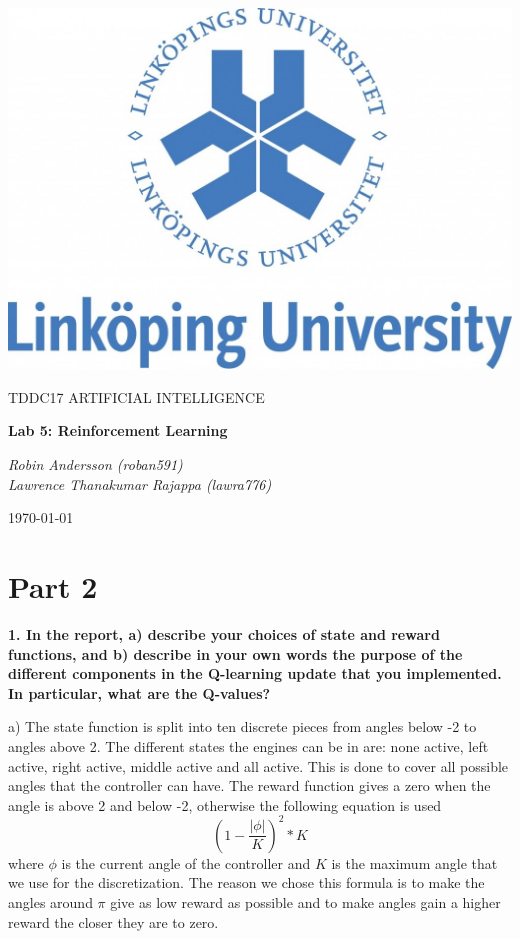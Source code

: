 \documentclass[a4paper,10pt]{article}
\begin{document}
\begin{titlepage}
	\centering
	\includegraphics[width=.6\textwidth]{liu-logo.png}\par
	\vfill
	{\scshape\Large TDDC17 ARTIFICIAL INTELLIGENCE\par}
	{\huge\bfseries Lab 5: Reinforcement Learning\par}
	\vspace{1cm}
	{\large\itshape Robin Andersson (roban591) \\ Lawrence Thanakumar Rajappa (lawra776)\par}
	\vfill
	{\large \today\par}
\end{titlepage}

\section*{Part 2}

\textbf{1. In the report, 
a) describe your choices of state and reward functions, and
b) describe in your own words the purpose of the different components in the Q-learning 
update that you implemented. In particular, what are the Q-values?}

a)
The state function is split into ten discrete pieces from angles below -2 to angles above 2.
The different states the engines can be in are: none active, left active, right active, middle active and all active.
This is done to cover all possible angles that the controller can have.
The reward function gives a zero when the angle is above 2 and below -2,
otherwise the following equation is used
\begin{equation}
    \label{eq:reward}
    (1 - \frac{|\phi|}{K})^2 * K
\end{equation} 
where $\phi$ is the current angle of the controller and $K$ is the maximum angle that we use for the discretization.
The reason we chose this formula is to make the angles around $\pi$ give as low reward as possible
and to make angles gain a higher reward the closer they are to zero.
\end{document}
